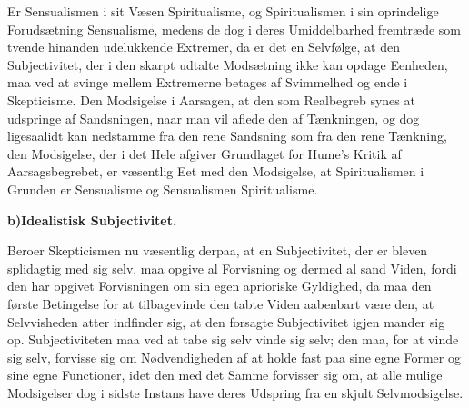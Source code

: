 \documentclass[12pt]{book}
\newcommand{\opage}[1]{\marginnote{\footnotesize\textit{[#1]}}}
\begin{document}
Er Sensualismen i sit Væsen Spiritualisme, og Spiritualismen i sin oprindelige
Forudsætning Sensualisme, medens de dog i deres Umiddelbarhed fremtræde som tvende
hinanden udelukkende Extremer, da er det en Selvfølge, at den Subjectivitet, der i
den skarpt udtalte Modsætning ikke kan opdage Eenheden, maa ved at svinge mellem
Extremerne betages af Svimmelhed og ende i Skepticisme. Den Modsigelse i Aarsagen, at
den som Realbegreb synes at udspringe af Sandsningen, naar man vil aflede den af
Tænkningen, og dog ligesaalidt kan nedstamme fra den rene Sandsning som fra den rene
Tænkning, den Modsigelse, der i det Hele afgiver Grundlaget for Hume's Kritik af
Aarsagsbegrebet, er væsentlig Eet med den Modsigelse, at Spiritualismen i Grunden er
Sensualisme og Sensualismen Spiritualisme.

\begin{center}
{\bfseries b)\quad Idealistisk Subjectivitet.}
\end{center}

Beroer Skepticismen nu væsentlig derpaa, at en Subjectivitet, der er bleven
splidagtig med sig selv, maa opgive al Forvisning og dermed al sand Viden, fordi den
har opgivet Forvisningen om sin egen aprioriske Gyldighed, da maa
\opage{30} den første Betingelse for at tilbagevinde den tabte Viden aabenbart være den, at
Selvvisheden atter indfinder sig, at den forsagte Subjectivitet igjen mander sig op.
Subjectiviteten maa ved at tabe sig selv vinde sig selv; den maa, for at vinde sig
selv, forvisse sig om Nødvendigheden af at holde fast paa sine egne Former og sine
egne Functioner, idet den med det Samme forvisser sig om, at alle mulige Modsigelser
dog i sidste Instans have deres Udspring fra en skjult Selvmodsigelse.
\end{document}
